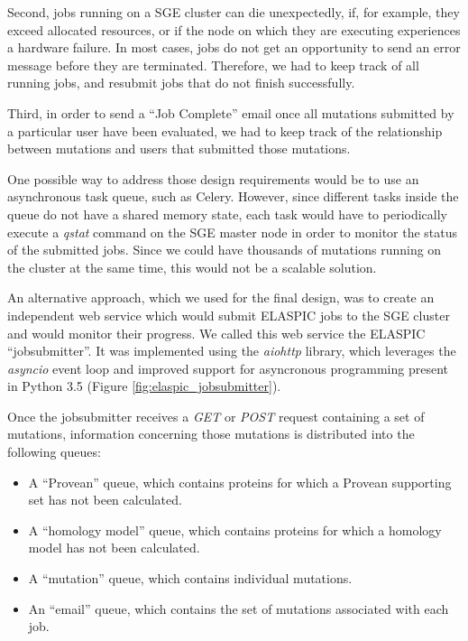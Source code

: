 Second, jobs running on a SGE cluster can die unexpectedly, if, for example, they exceed allocated resources, or if the node on which they are executing experiences a hardware failure. In most cases, jobs do not get an opportunity to send an error message before they are terminated. Therefore, we had to keep track of all running jobs, and resubmit jobs that do not finish successfully.

Third, in order to send a ``Job Complete'' email once all mutations submitted by a particular user have been evaluated, we had to keep track of the relationship between mutations and users that submitted those mutations.

One possible way to address those design requirements would be to use an asynchronous task queue, such as Celery. However, since different tasks inside the queue do not have a shared memory state, each task would have to periodically execute a \textit{qstat} command on the SGE master node in order to monitor the status of the submitted jobs. Since we could have thousands of mutations running on the cluster at the same time, this would not be a scalable solution.

An alternative approach, which we used for the final design, was to create an independent web service which would submit ELASPIC jobs to the SGE cluster and would monitor their progress. We called this web service the ELASPIC ``jobsubmitter''. It was implemented using the \textit{aiohttp} library, which leverages the \textit{asyncio} event loop and improved support for asyncronous programming present in Python 3.5 (Figure \ref{fig:elaspic_jobsubmitter}).

Once the jobsubmitter receives a \textit{GET} or \textit{POST} request containing a set of mutations, information concerning those mutations is distributed into the following queues:

\vspace{-\topsep}
\begin{itemize}
	\itemsep0em
	\item A ``Provean'' queue, which contains proteins for which a Provean supporting set has not been calculated.
	\item A ``homology model'' queue, which contains proteins for which a homology model has not been calculated.
	\item A ``mutation'' queue, which contains individual mutations.
	\item An ``email'' queue, which contains the set of mutations associated with each job.
\end{itemize}

